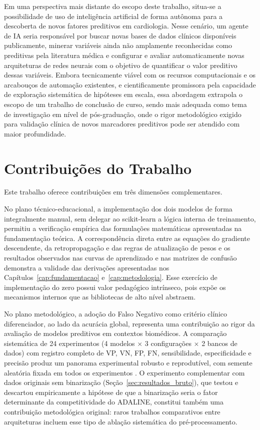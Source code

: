 Em uma perspectiva mais distante do escopo deste trabalho, situa-se a possibilidade de uso de inteligência artificial de forma autônoma para a descoberta de novos fatores preditivos em cardiologia. Nesse cenário, um agente de IA seria responsável por buscar novas bases de dados clínicos disponíveis publicamente, minerar variáveis ainda não amplamente reconhecidas como preditivas pela literatura médica e configurar e avaliar automaticamente novas arquiteturas de redes neurais com o objetivo de quantificar o valor preditivo dessas variáveis. Embora tecnicamente viável com os recursos computacionais e os arcabouços de automação existentes, e cientificamente promissora pela capacidade de exploração sistemática de hipóteses em escala, essa abordagem extrapola o escopo de um trabalho de conclusão de curso, sendo mais adequada como tema de investigação em nível de pós-graduação, onde o rigor metodológico exigido para validação clínica de novos marcadores preditivos pode ser atendido com maior profundidade.

\section{Contribuições do Trabalho}

Este trabalho oferece contribuições em três dimensões complementares.

No plano técnico-educacional, a implementação dos dois modelos de forma integralmente manual, sem delegar ao scikit-learn a lógica interna de treinamento, permitiu a verificação empírica das formulações matemáticas apresentadas na fundamentação teórica. A correspondência direta entre as equações do gradiente descendente, da retropropagação e das regras de atualização de pesos e os resultados observados nas curvas de aprendizado e nas matrizes de confusão demonstra a validade das derivações apresentadas nos Capítulos~\ref{cap:fundamentacao} e~\ref{cap:metodologia}. Esse exercício de implementação do zero possui valor pedagógico intrínseco, pois expõe os mecanismos internos que as bibliotecas de alto nível abstraem.

No plano metodológico, a adoção do Falso Negativo como critério clínico diferenciador, ao lado da acurácia global, representa uma contribuição ao rigor da avaliação de modelos preditivos em contextos biomédicos. A comparação sistemática de 24 experimentos (4 modelos $\times$ 3 configurações $\times$ 2 bancos de dados) com registro completo de VP, VN, FP, FN, sensibilidade, especificidade e precisão produz um panorama experimental robusto e reprodutível, com semente aleatória fixada em todos os experimentos \cite{pedregosa2011}. O experimento complementar com dados originais sem binarização (Seção~\ref{sec:resultados_bruto}), que testou e descartou empiricamente a hipótese de que a binarização seria o fator determinante da competitividade do ADALINE, constitui também uma contribuição metodológica original: raros trabalhos comparativos entre arquiteturas incluem esse tipo de ablação sistemática do pré-processamento.

